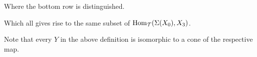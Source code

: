 \begin{definition}
\begin{enumerate}
{\begin{center}
        \end{center}

        Where the bottom row is distinguished.
    }
    \end{enumerate}

    Which all gives rise to the same subset of \( \operatorname{Hom}_{{\mathcal{T}}}(\Sigma(X_0), X_3) \).
\end{definition}

\begin{remark}
    Note that every \( Y \) in the above definition is isomorphic to a cone of the respective map.
\end{remark}
